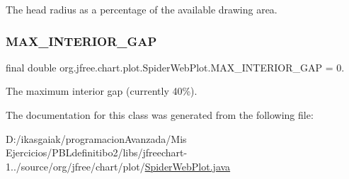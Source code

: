 The head radius as a percentage of the available drawing area. \mbox{\label{classorg_1_1jfree_1_1chart_1_1plot_1_1_spider_web_plot_ade44564be7b66884622b44f02b51475e}} 
\subsubsection{\texorpdfstring{M\+A\+X\+\_\+\+I\+N\+T\+E\+R\+I\+O\+R\+\_\+\+G\+AP}{MAX\_INTERIOR\_GAP}}
{\footnotesize\ttfamily final double org.\+jfree.\+chart.\+plot.\+Spider\+Web\+Plot.\+M\+A\+X\+\_\+\+I\+N\+T\+E\+R\+I\+O\+R\+\_\+\+G\+AP = 0.\hspace{0.3cm}{\ttfamily [static]}}

The maximum interior gap (currently 40\%). 

The documentation for this class was generated from the following file\+:\begin{DoxyCompactItemize}
\item 
D\+:/ikasgaiak/programacion\+Avanzada/\+Mis Ejercicios/\+P\+B\+Ldefinitibo2/libs/jfreechart-\/1../source/org/jfree/chart/plot/\mbox{\hyperlink{_spider_web_plot_8java}{Spider\+Web\+Plot.\+java}}\end{DoxyCompactItemize}
